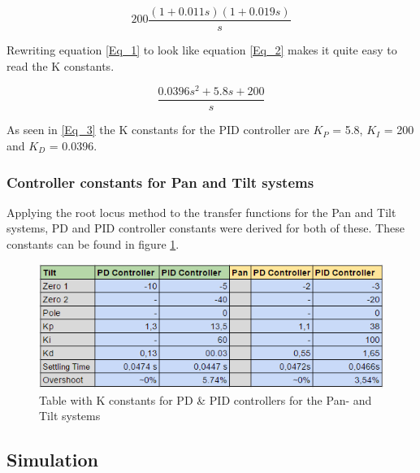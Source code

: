 \begin{equation}
200\frac{(1+0.011s)(1+0.019s)}{s}
\label{Eq_1} 
\end{equation}

Rewriting equation \ref{Eq_1} to look like equation \ref{Eq_2} makes it quite easy to read the K constants.

\begin{equation}
\frac{0.0396s^2 +5.8s+200}{s}
\label{Eq_3}
\end{equation}

As seen in \ref{Eq_3} the K constants for the PID controller are $K_P$ = 5.8, $K_I$ = 200 and $K_D$ = 0.0396.

\subsubsection{Controller constants for Pan and Tilt systems}

Applying the root locus method to the transfer functions for the Pan and Tilt systems, PD and PID controller constants were derived for both of these. These constants can be found in figure \ref{fig:PIDControllerTable}.

\begin{figure}[h!]
\centering
\includegraphics[scale=0.7]{Billeder/PIDControllerTable.png}
\caption{Table with K constants for PD \& PID controllers for the Pan- and Tilt systems}
\label{fig:PIDControllerTable}
\end{figure}

\subsection{Simulation}

